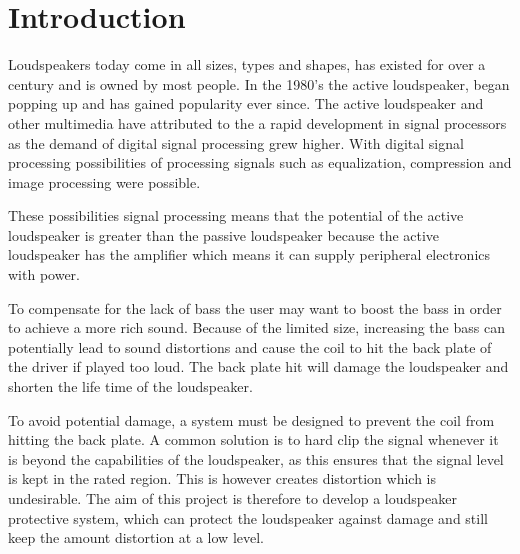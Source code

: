 \chapter{Introduction}
Loudspeakers today come in all sizes, types and shapes, has existed for over a century and is owned by most people. In the 1980's the active loudspeaker, began popping up and has gained popularity ever since. The active loudspeaker and other multimedia have attributed to the a rapid development in signal processors as the demand of digital signal processing grew higher. With digital signal processing possibilities of processing signals such as equalization, compression and image processing were possible.

These possibilities signal processing means that the potential of the active loudspeaker is greater than the passive loudspeaker because the active loudspeaker has the amplifier which means it can supply peripheral electronics with power.


To compensate for the lack of bass the user may want to boost the bass in order to achieve a more rich sound. Because of the limited size, increasing the bass can potentially lead to sound distortions and cause the coil to hit the back plate of the driver if played too loud. The back plate hit will damage the loudspeaker and shorten the life time of the loudspeaker.

To avoid potential damage, a system must be designed to prevent the coil from hitting the back plate. A common solution is to hard clip the signal whenever it is beyond the capabilities of the loudspeaker, as this ensures that the signal level is kept in the rated region. This is however creates distortion which is undesirable. The aim of this project is therefore to develop a loudspeaker protective system, which can protect the loudspeaker against damage and still keep the amount distortion at a low level.




